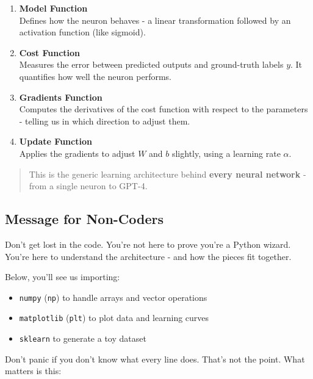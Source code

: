 \documentclass[11pt]{article}
\begin{document}
\begin{enumerate}
    \item \textbf{Model Function} \\
    Defines how the neuron behaves - a linear transformation followed by an activation function (like sigmoid).
    
    \item \textbf{Cost Function} \\
    Measures the error between predicted outputs and ground-truth labels $y$. It quantifies how well the neuron performs.
    
    \item \textbf{Gradients Function} \\
    Computes the derivatives of the cost function with respect to the parameters - telling us in which direction to adjust them.
    
    \item \textbf{Update Function} \\
    Applies the gradients to adjust $W$ and $b$ slightly, using a learning rate $\alpha$.
\end{enumerate}

\begin{quote}
This is the generic learning architecture behind \textbf{every neural network} - from a single neuron to GPT-4.
\end{quote}

\subsection*{Message for Non-Coders}

Don't get lost in the code. You're not here to prove you're a Python wizard.  
You're here to understand the architecture - and how the pieces fit together.

\vspace{0.5em}

Below, you'll see us importing:
\begin{itemize}
    \item \texttt{numpy} (\texttt{np}) to handle arrays and vector operations
    \item \texttt{matplotlib} (\texttt{plt}) to plot data and learning curves
    \item \texttt{sklearn} to generate a toy dataset
\end{itemize}

Don't panic if you don't know what every line does. That's not the point.  
What matters is this:
\end{document}
